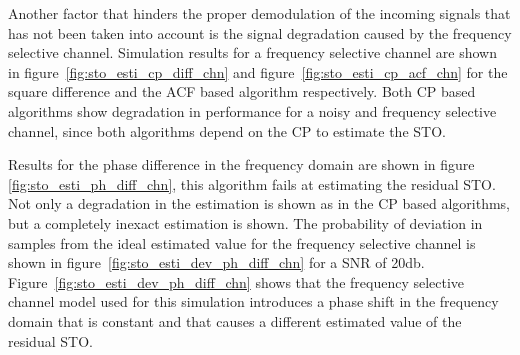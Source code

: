 
Another factor that hinders the proper demodulation of the incoming signals that has not been taken into account is the signal degradation caused by the frequency selective channel. Simulation results for a frequency selective channel are shown in figure~\ref{fig:sto_esti_cp_diff_chn} and figure~\ref{fig:sto_esti_cp_acf_chn} for the square difference and the ACF based algorithm respectively. Both CP based algorithms show degradation in performance for a noisy and frequency selective channel, since both algorithms depend on the CP to estimate the STO.

Results for the phase difference in the frequency domain are shown in figure \ref{fig:sto_esti_ph_diff_chn}, this algorithm fails at estimating the residual STO. Not only a degradation in the estimation is shown as in the CP based algorithms, but a completely inexact estimation is shown. The probability of deviation in samples from the ideal estimated value for the frequency selective channel is shown in figure~\ref{fig:sto_esti_dev_ph_diff_chn} for a SNR of 20db. Figure~\ref{fig:sto_esti_dev_ph_diff_chn} shows that the frequency selective channel model used for this simulation introduces a phase shift in the frequency domain that is constant and that causes a different estimated value of the residual STO. 



